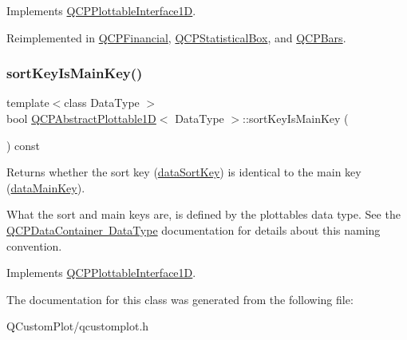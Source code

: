Implements \mbox{\hyperlink{class_q_c_p_plottable_interface1_d_a67093e4ccf490ff5f7750640941ff34c}{Q\+C\+P\+Plottable\+Interface1D}}.



Reimplemented in \mbox{\hyperlink{class_q_c_p_financial_a3c5beb1ab028a1dba845fc9dcffc7cf4}{Q\+C\+P\+Financial}}, \mbox{\hyperlink{class_q_c_p_statistical_box_a42febad6ad5e924a151434cc434b4ffc}{Q\+C\+P\+Statistical\+Box}}, and \mbox{\hyperlink{class_q_c_p_bars_ab03bb6125c3e983b89d694f75ce6b3d5}{Q\+C\+P\+Bars}}.

\mbox{\label{class_q_c_p_abstract_plottable1_d_a022e8905f5a667d8379493d6a037e79f}} 
\subsubsection{\texorpdfstring{sort\+Key\+Is\+Main\+Key()}{sortKeyIsMainKey()}}
{\footnotesize\ttfamily template$<$class Data\+Type $>$ \\
bool \mbox{\hyperlink{class_q_c_p_abstract_plottable1_d}{Q\+C\+P\+Abstract\+Plottable1D}}$<$ Data\+Type $>$\+::sort\+Key\+Is\+Main\+Key (\begin{DoxyParamCaption}{ }\end{DoxyParamCaption}) const\hspace{0.3cm}{\ttfamily [virtual]}}





Returns whether the sort key (\mbox{\hyperlink{class_q_c_p_abstract_plottable1_d_a6fce4e684f33a31c45928899b5d9ab4b}{data\+Sort\+Key}}) is identical to the main key (\mbox{\hyperlink{class_q_c_p_abstract_plottable1_d_ab14ab428595856bf76e04499017fa8dc}{data\+Main\+Key}}).

What the sort and main keys are, is defined by the plottable\textquotesingle{}s data type. See the \mbox{\hyperlink{class_q_c_p_data_container_qcpdatacontainer-datatype}{Q\+C\+P\+Data\+Container Data\+Type}} documentation for details about this naming convention. 

Implements \mbox{\hyperlink{class_q_c_p_plottable_interface1_d_a229e65e7ab968dd6cd0e259fa504b79d}{Q\+C\+P\+Plottable\+Interface1D}}.



The documentation for this class was generated from the following file\+:\begin{DoxyCompactItemize}
\item 
Q\+Custom\+Plot/qcustomplot.\+h\end{DoxyCompactItemize}
